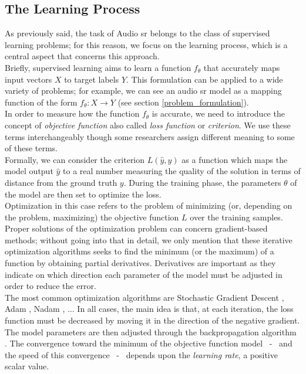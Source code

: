 \subsection{The Learning Process} %
As previously said, the task of Audio \gls{sr} belongs to the class of supervised learning problems; for this reason, we focus on the learning process, which is a central aspect that concerns this approach. \\
Briefly, supervised learning aims to learn a function $f_{\theta}$ that accurately maps input vectors $X$ to target labels $Y$. This formulation can be applied to a wide variety of problems; for example, we can see an audio \gls{sr} model as a mapping function of the form $f_{\theta}: X \rightarrow Y$ (see section \ref{problem_formulation}). \\
In order to measure how the function $f_{\theta}$ is accurate, we need to introduce the concept of \textit{objective function} also called \textit{loss function} or \textit{criterion}. We use these terms interchangeably though some researchers assign different meaning to some of these terms.\\
Formally, we can consider the criterion $L(\hat{y}, y)$ as a function which maps the model output $\hat{y}$ to a real number measuring the quality of the solution in terms of distance from the ground truth $y$. During the training phase, the parameters $\theta$ of the model are then set to optimize the loss. \\
Optimization in this case refers to the problem of minimizing (or, depending on the problem, maximizing) the objective function $L$ over the training samples. Proper solutions of the optimization problem can concern gradient-based methods; without going into that in detail, we only mention that these iterative optimization algorithms seeks to find the minimum (or the maximum) of a function by obtaining partial derivatives. Derivatives are important as they indicate on which direction each parameter of the model must be adjusted in order to reduce the error. \\
The most common optimization algorithms are Stochastic Gradient Descent \cite{kiefer1952stochastic}, Adam \cite{kingma2014adam}, Nadam \cite{dozat2016incorporating}, $\dots$ In all cases, the main idea is that, at each iteration, the loss function must be decreased by moving it in the direction of the negative gradient. The model parameters are then adjusted through the backpropagation algorithm \cite{amari1993backpropagation}. The convergence toward the minimum of the objective function model ~-~ and the speed of this convergence ~-~ depends upon the \textit{learning rate}, a positive scalar value. \\
